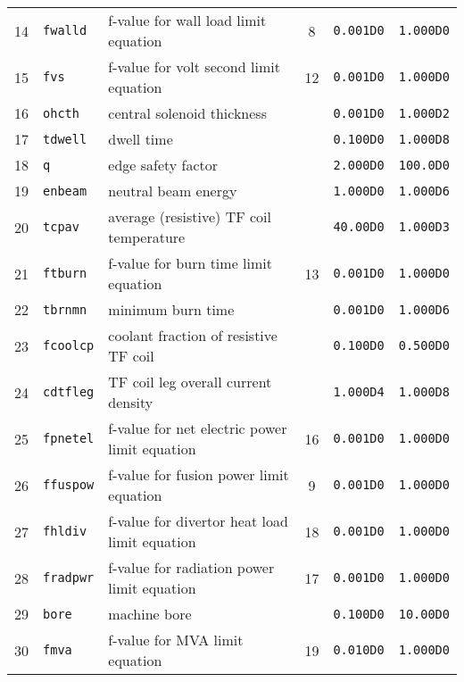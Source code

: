 \documentclass[11pt,a4paper]{report}
\begin{document}
\begin{table}[tbph]
\begin{center}
\begin{tabular}{||c|l|l|c|c|c||}
14  & \texttt{fwalld}   & f-value for wall load limit equation          & 8   & \texttt{0.001D0} & \texttt{1.000D0} \\
15  & \texttt{fvs}      & f-value for volt second limit equation        & 12  & \texttt{0.001D0} & \texttt{1.000D0} \\
16  & \texttt{ohcth}    & central solenoid thickness                    &     & \texttt{0.001D0} & \texttt{1.000D2} \\
17  & \texttt{tdwell}   & dwell time                                    &     & \texttt{0.100D0} & \texttt{1.000D8} \\
18  & \texttt{q}        & edge safety factor                            &     & \texttt{2.000D0} & \texttt{100.0D0} \\
19  & \texttt{enbeam}   & neutral beam energy                           &     & \texttt{1.000D0} & \texttt{1.000D6} \\
20  & \texttt{tcpav}    & average (resistive) TF coil temperature       &     & \texttt{40.00D0} & \texttt{1.000D3} \\
21  & \texttt{ftburn}   & f-value for burn time limit equation          & 13  & \texttt{0.001D0} & \texttt{1.000D0} \\
22  & \texttt{tbrnmn}   & minimum burn time                             &     & \texttt{0.001D0} & \texttt{1.000D6} \\
23  & \texttt{fcoolcp}  & coolant fraction of resistive TF coil         &     & \texttt{0.100D0} & \texttt{0.500D0} \\
24  & \texttt{cdtfleg}  & TF coil leg overall current density           &     & \texttt{1.000D4} & \texttt{1.000D8} \\
25  & \texttt{fpnetel}  & f-value for net electric power limit equation & 16  & \texttt{0.001D0} & \texttt{1.000D0} \\
26  & \texttt{ffuspow}  & f-value for fusion power limit equation       & 9   & \texttt{0.001D0} & \texttt{1.000D0} \\
27  & \texttt{fhldiv}   & f-value for divertor heat load limit equation & 18  & \texttt{0.001D0} & \texttt{1.000D0} \\
28  & \texttt{fradpwr}  & f-value for radiation power limit equation    & 17  & \texttt{0.001D0} & \texttt{1.000D0} \\
29  & \texttt{bore}     & machine bore                                  &     & \texttt{0.100D0} & \texttt{10.00D0} \\
30  & \texttt{fmva}     & f-value for MVA limit equation                & 19  & \texttt{0.010D0} & \texttt{1.000D0} \\

\end{tabular}
\end{center}
\end{table}
\end{document}
